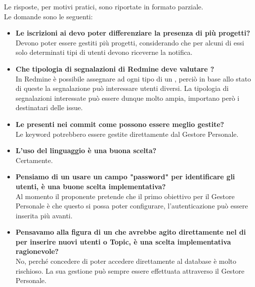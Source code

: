     	Le risposte, per motivi pratici, sono riportate in formato parziale.\\
        Le domande sono le seguenti:
    	\begin{itemize}
    		\item \textbf{Le iscrizioni ai  devo poter differenziare la presenza di più progetti?}\\
            Devono poter essere gestiti più progetti, considerando che per alcuni di essi solo determinati tipi di utenti devono riceverne la notifica.
    		\item \textbf{Che tipologia di segnalazioni di Redmine deve valutare \progetto?}\\
            In Redmine è possibile assegnare ad ogni tipo di  un , perciò in base allo stato di queste la segnalazione può interessare utenti diversi. La tipologia di segnalazioni interessate può essere dunque molto ampia, importano però i destinatari delle issue.
    		\item \textbf{Le  presenti nei commit come possono essere meglio gestite?}\\
            Le keyword potrebbero essere gestite direttamente dal Gestore Personale.
    		\item \textbf{L'uso del linguaggio  è una buona scelta?}\\
            Certamente.
    		\item \textbf{Pensiamo di un usare un campo "password" per identificare gli utenti, è una buone scelta implementativa?}\\
            Al momento il proponente pretende che il primo obiettivo per il Gestore Personale è che questo si possa poter configurare, l'autenticazione può essere inserita più avanti.
    		\item \textbf{Pensavamo alla figura di un  che avrebbe agito direttamente nel  di  per inserire nuovi utenti o Topic, è una scelta implementativa ragionevole?}\\
            No, perché concedere di poter accedere direttamente al database è molto rischioso. La sua gestione può sempre essere effettuata attraverso il Gestore Personale.
    	\end{itemize}
